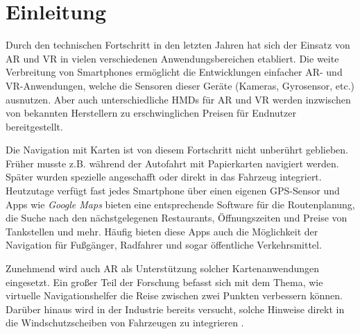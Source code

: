 \chapter{Einleitung}
\label{chap:einleitung}
Durch den technischen Fortschritt in den letzten Jahren hat sich der Einsatz von \gls{AR} und \gls{VR} in vielen verschiedenen Anwendungsbereichen etabliert.
Die weite Verbreitung von Smartphones ermöglicht die Entwicklungen einfacher \gls{AR}- und \gls{VR}-Anwendungen, welche die Sensoren dieser Geräte (Kameras, Gyrosensor, etc.) ausnutzen.
Aber auch unterschiedliche \glspl{HMD} für \gls{AR} und \gls{VR} werden inzwischen von bekannten Herstellern zu erschwinglichen Preisen für Endnutzer bereitgestellt.

Die Navigation mit Karten ist von diesem Fortschritt nicht unberührt geblieben.
Früher musste z.B. während der Autofahrt mit Papierkarten navigiert werden.
Später wurden spezielle  angeschafft oder direkt in das Fahrzeug integriert.
Heutzutage verfügt fast jedes Smartphone über einen eigenen \gls{GPS}-Sensor und Apps wie \emph{Google Maps} \parencite{GoogleLLC2018} bieten eine entsprechende Software für die Routenplanung, die Suche nach den nächstgelegenen Restaurants, Öffnungszeiten und Preise von Tankstellen und mehr.  
Häufig bieten diese Apps auch die Möglichkeit der Navigation für Fußgänger, Radfahrer und sogar öffentliche Verkehrsmittel.

Zunehmend wird auch \gls{AR} als Unterstützung solcher Kartenanwendungen eingesetzt.
Ein großer Teil der Forschung befasst sich mit dem Thema, wie virtuelle Navigationshelfer die Reise zwischen zwei Punkten verbessern können.
Darüber hinaus wird in der Industrie bereits versucht, solche Hinweise direkt in die Windschutzscheiben von Fahrzeugen zu integrieren \parencites{Cunningham2017}{Sygic2018}.

